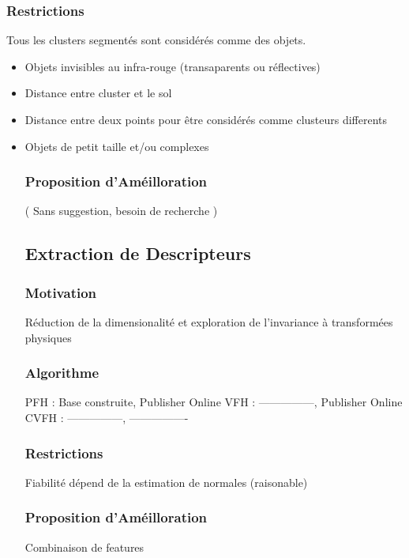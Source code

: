         \subsubsection{Restrictions}
            Tous les clusters segmentés sont considérés comme des objets. 
            \begin{itemize}
                \item Objets invisibles au infra-rouge (transaparents ou réflectives)
                \item Distance entre cluster et le sol 
                \item Distance entre deux points pour être considérés comme clusteurs differents 
                \item Objets de petit taille et/ou complexes 

        \subsubsection{Proposition d'Améilloration}
            ( Sans suggestion, besoin de recherche )

    \subsection {Extraction de Descripteurs}

        \subsubsection{Motivation}
            Réduction de la dimensionalité et exploration de l'invariance à transformées physiques

        \subsubsection{Algorithme}
            PFH  : Base construite, Publisher Online 
            VFH  : ---------------, Publisher Online 
            CVFH : ---------------, ----------------

        \subsubsection{Restrictions}
            Fiabilité dépend de la estimation de normales (raisonable)

        \subsubsection{Proposition d'Améilloration}
            Combinaison de features 


\end{itemize}
